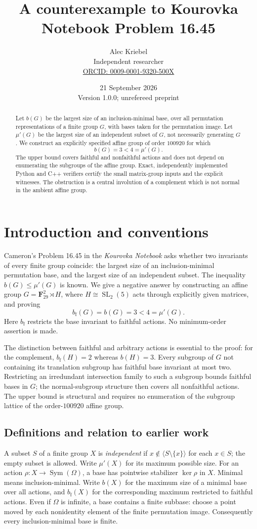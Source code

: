 \documentclass[11pt]{article}
\title{A counterexample to Kourovka Notebook Problem 16.45}
\author{Alec Kriebel\\\small Independent researcher\\\small\href{https://orcid.org/0009-0001-9320-500X}{ORCID: 0009-0001-9320-500X}}
\date{21 September 2026\\\small Version 1.0.0; unrefereed preprint}
\theoremstyle{remark}\newtheorem{remark}[theorem]{Remark}
\newcommand{\F}{\mathbf F}
\newcommand{\mup}{\mu'}
\newcommand{\bfth}{b_{\mathrm f}}
\newcommand{\SL}{\operatorname{SL}}
\newcommand{\Sym}{\operatorname{Sym}}
\begin{document}
\maketitle
\begin{abstract}
Let $b(G)$ be the largest size of an inclusion-minimal base, over all
permutation representations of a finite group $G$, with bases taken for the
permutation image. Let $\mup(G)$ be the largest size of an independent subset
of $G$, not necessarily generating $G$. We construct an explicitly specified
affine group of order $100920$ for which
\[
                 b(G)=3<4=\mup(G).
\]
The upper bound covers faithful and nonfaithful actions and does not depend on
enumerating the subgroups of the affine group. Exact, independently implemented
Python and C++ verifiers certify the small matrix-group inputs and the explicit
witnesses. The obstruction is a central involution of a complement which is not
normal in the ambient affine group.
\end{abstract}

\section{Introduction and conventions}
Cameron's Problem 16.45 in the \emph{Kourovka Notebook} asks whether two
invariants of every finite group coincide: the largest size of an
inclusion-minimal permutation base, and the largest size of an independent
subset. The inequality $b(G)\le\mup(G)$ is known. We give a negative answer
by constructing an affine group $G=\F_{29}^2\rtimes H$, where
$H\cong\SL_2(5)$ acts through explicitly given matrices, and proving
\[
                 \bfth(G)=b(G)=3<4=\mup(G).
\]
Here $\bfth$ restricts the base invariant to faithful actions. No
minimum-order assertion is made.

The distinction between faithful and arbitrary actions is essential to the
proof: for the complement, $\bfth(H)=2$ whereas $b(H)=3$. Every subgroup of
$G$ not containing its translation subgroup has faithful base invariant at
most two. Restricting an irredundant intersection family to such a subgroup
bounds faithful bases in $G$; the normal-subgroup structure then covers all
nonfaithful actions. The upper bound is structural and requires no enumeration
of the subgroup lattice of the order-$100920$ affine group.

\subsection{Definitions and relation to earlier work}
A subset $S$ of a finite group $X$ is \emph{independent} if
$x\notin\langle S\setminus\{x\}\rangle$ for each $x\in S$; the empty subset is
allowed. Write $\mup(X)$ for its maximum possible size. For an action
$\rho:X\to\Sym(\Omega)$, a base has pointwise stabilizer $\ker\rho$ in $X$.
Minimal means inclusion-minimal. Write $b(X)$ for the maximum size of a minimal
base over all actions, and $\bfth(X)$ for the corresponding maximum restricted
to faithful actions. Even if $\Omega$ is infinite, a base contains a finite
subbase: choose a point moved by each nonidentity element of the finite
permutation image. Consequently every inclusion-minimal base is finite.
\end{document}
